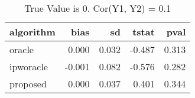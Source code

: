 \begin{table}[h!]
\caption{True Value is 0. Cor(Y1, Y2) = 0.1}
\centering
\begin{tabular}[t]{lrrrr}
\toprule
algorithm & bias & sd & tstat & pval\\
\midrule
oracle & 0.000 & 0.032 & -0.487 & 0.313\\
ipworacle & -0.001 & 0.082 & -0.576 & 0.282\\
proposed & 0.000 & 0.037 & 0.401 & 0.344\\
\bottomrule
\end{tabular}
\end{table}
